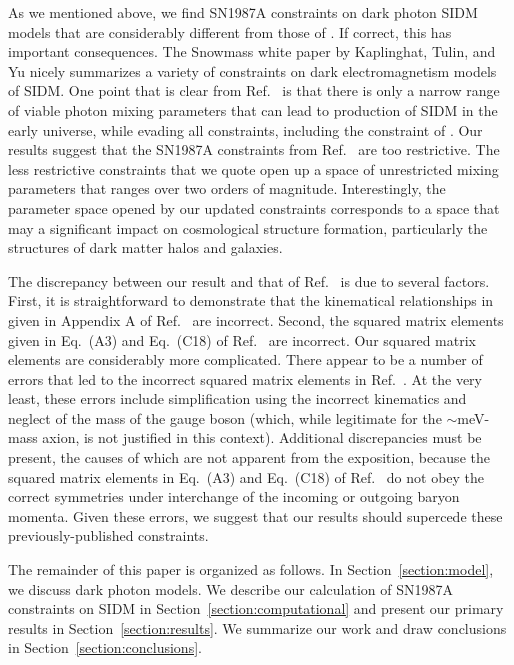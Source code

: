 \documentclass[nofootinbib,prd,superscriptaddress,twocolumn]{revtex4}
\begin{document}
As we mentioned above, we find SN1987A constraints on dark photon SIDM models that are considerably different 
from those of \cite{dent_etal12}. If correct, this has important consequences. The Snowmass white paper by Kaplinghat, 
Tulin, and Yu \cite{kaplinghat_etal13_whitepaper} nicely summarizes a variety of constraints on dark electromagnetism models of 
SIDM. One point that is clear from Ref.~\cite{kaplinghat_etal13_whitepaper} is that there is only a narrow range of 
viable photon mixing parameters that can lead to production of SIDM in the early universe, while evading all constraints, 
including the constraint of \cite{dent_etal12}. Our results suggest that the SN1987A constraints from Ref.~\cite{dent_etal12} 
are too restrictive. The less restrictive constraints that we quote open up a space of unrestricted mixing parameters that 
ranges over two orders of magnitude. Interestingly, the parameter space opened by our updated constraints corresponds to a 
space that may a significant impact on cosmological structure formation, particularly the structures of dark matter halos and galaxies. 


The discrepancy between our result and that of Ref.~\cite{dent_etal12} is due to several factors. First, it is straightforward to 
demonstrate that the kinematical relationships in given in Appendix A of Ref.~\cite{dent_etal12} are incorrect. Second, the 
squared matrix elements given in Eq.~(A3) and Eq.~(C18) of Ref.~\cite{dent_etal12} are incorrect. Our squared matrix elements 
are considerably more complicated. There appear to be a number of errors that led to the incorrect squared matrix elements in 
Ref.~\cite{dent_etal12}. At the very least, these errors include simplification using the incorrect kinematics and neglect of the 
mass of the gauge boson (which, while legitimate for the $\sim$meV-mass axion, is not justified in this context). Additional 
discrepancies must be present, the causes of which are not apparent from the exposition, 
because the squared matrix elements in Eq.~(A3) and Eq.~(C18) of Ref.~\cite{dent_etal12} 
do not obey the correct symmetries under interchange of the incoming or outgoing baryon momenta. 
Given these errors, we suggest that our results should supercede these previously-published constraints.

The remainder of this paper is organized as follows. In Section~\ref{section:model}, we discuss 
dark photon models. We describe our calculation of SN1987A constraints on SIDM in 
Section~\ref{section:computational} and present our primary results in Section~\ref{section:results}. 
We summarize our work and draw conclusions in Section~\ref{section:conclusions}. 
\end{document}
